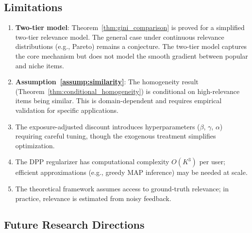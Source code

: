 \documentclass[11pt,a4paper]{article}
\theoremstyle{definition}
\theoremstyle{plain}
\theoremstyle{remark}
\begin{document}
\subsection{Limitations}
\label{subsec:limitations}

\begin{enumerate}[label=\textbf{L.\arabic*}]
    \item \textbf{Two-tier model}: Theorem~\ref{thm:gini_comparison} is proved for a simplified two-tier relevance model. The general case under continuous relevance distributions (e.g., Pareto) remains a conjecture. The two-tier model captures the core mechanism but does not model the smooth gradient between popular and niche items.
    
    \item \textbf{Assumption~\ref{assump:similarity}}: The homogeneity result (Theorem~\ref{thm:conditional_homogeneity}) is conditional on high-relevance items being similar. This is domain-dependent and requires empirical validation for specific applications.
    
    \item The exposure-adjusted discount introduces hyperparameters ($\beta$, $\gamma$, $\alpha$) requiring careful tuning, though the exogenous treatment simplifies optimization.
    
    \item The DPP regularizer has computational complexity $O(K^3)$ per user; efficient approximations (e.g., greedy MAP inference) may be needed at scale.
    
    \item The theoretical framework assumes access to ground-truth relevance; in practice, relevance is estimated from noisy feedback.
\end{enumerate}

\subsection{Future Research Directions}
\label{subsec:future}
\end{document}
